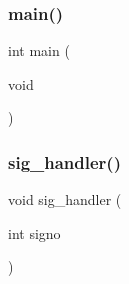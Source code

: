 \mbox{\label{signal_8c_a840291bc02cba5474a4cb46a9b9566fe}} 
\subsubsection{main()}
{\footnotesize\ttfamily int main (\begin{DoxyParamCaption}\item[{void}]{ }\end{DoxyParamCaption})}

\mbox{\label{signal_8c_a4f31a6fd48ee5d4579ae4aaaa3cae285}} 
\subsubsection{sig\+\_\+handler()}
{\footnotesize\ttfamily void sig\+\_\+handler (\begin{DoxyParamCaption}\item[{int}]{signo }\end{DoxyParamCaption})}

